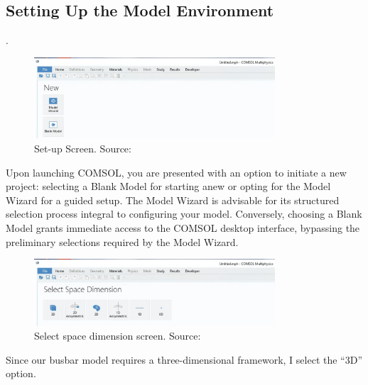 \subsection{Setting Up the Model Environment}.
\begin{figure}[H]
  \centering
  \includegraphics[width=0.8\textwidth]{Chapters/Figures/Chapter 3 Figures/Set-up Screen.png}
  \caption{Set-up Screen. Source: \cite{multiphysics__modeling_nodate}}
  \label{fig:Set-up Screen}
\end{figure}

Upon launching COMSOL, you are presented with an option to initiate a new project: selecting a Blank Model for starting anew or opting for the Model Wizard for a guided setup. The Model Wizard is advisable for its structured selection process integral to configuring your model. Conversely, choosing a Blank Model grants immediate access to the COMSOL desktop interface, bypassing the preliminary selections required by the Model Wizard.

\begin{figure}[H]
  \centering
  \includegraphics[width=0.8\textwidth]{Chapters/Figures/Chapter 3 Figures/Select Space Dimension.png}
  \caption{Select space dimension screen. Source: \cite{multiphysics__modeling_nodate}}
  \label{fig:Select Space Dimension}
\end{figure}

Since our busbar model requires a three-dimensional framework, I select the ``3D'' option.

